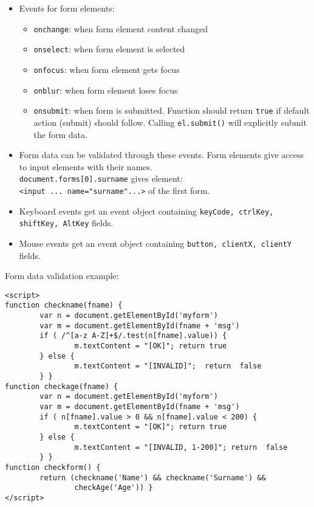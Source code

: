 \documentclass[trans,compress,xcolor=table]{beamer}
\begin{document}
\begin{frame}[fragile]
\begin{itemize}
\item Events for form elements:
\begin{itemize}
\item \lstinline!onchange!: when form element content changed
\item \lstinline!onselect!: when form element is selected
\item \lstinline!onfocus!: when form element gets focus
\item \lstinline!onblur!: when form element loses focus
\item \lstinline!onsubmit!: when form is submitted. Function
	should return \lstinline!true! if default action (submit)
	should follow. Calling \lstinline!el.submit()! will
	explicitly submit the form data.
\end{itemize}
\item Form data can be validated through these events. Form elements
	give access to input elements with their names.\\
	\lstinline!document.forms[0].surname! gives element:\\
	\lstinline!<input ... name="surname"...>! of the first form.
\item Keyboard events get an event object containing \lstinline!keyCode, ctrlKey, shiftKey, AltKey! fields.
\item Mouse events get an event object containing \lstinline!button, clientX, clientY! fields. 
\end{itemize}
\end{frame}

\begin{frame}[fragile]
Form data validation example:
\begin{lstlisting}
<script>
function checkname(fname) {
        var n = document.getElementById('myform')
        var m = document.getElementById(fname + 'msg')
        if ( /^[a-z A-Z]+$/.test(n[fname].value)) {   
                m.textContent = "[OK]"; return true
        } else {
                m.textContent = "[INVALID]";  return  false
        } }
function checkage(fname) {
        var n = document.getElementById('myform')
        var m = document.getElementById(fname + 'msg')
        if ( n[fname].value > 0 && n[fname].value < 200) {      
                m.textContent = "[OK]"; return true
        } else {
                m.textContent = "[INVALID, 1-200]"; return  false
        } }
function checkform() {
        return (checkname('Name') && checkname('Surname') && 
                checkAge('Age')) }
</script>
\end{lstlisting}
\end{frame}
\end{document}

